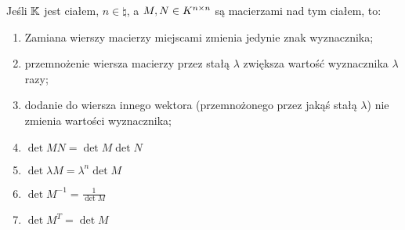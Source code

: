 \begin{fact}
	Jeśli \(\mathbb{K}\) jest ciałem, \(n \in \natural\), a \(M, N \in K^{n \times n}\) są macierzami nad tym ciałem, to:

	\begin{enumerate}
		\item Zamiana wierszy macierzy miejscami zmienia jedynie znak wyznacznika;
		\item przemnożenie wiersza macierzy przez stałą \(\lambda\) zwiększa wartość wyznacznika \(\lambda\) razy;
		\item dodanie do wiersza innego wektora (przemnożonego przez jakąś stałą \(\lambda\)) nie zmienia wartości wyznacznika;
		\item \( \det{MN} = \det{M} \det{N} \)
		\item \( \det{\lambda M} = \lambda^n \det{M}\)
		\item \( \det{M^{-1}} = \frac{1}{\det{M}}\)
		\item \( \det{M^T} = \det{M}\)
	\end{enumerate}

\end{fact}